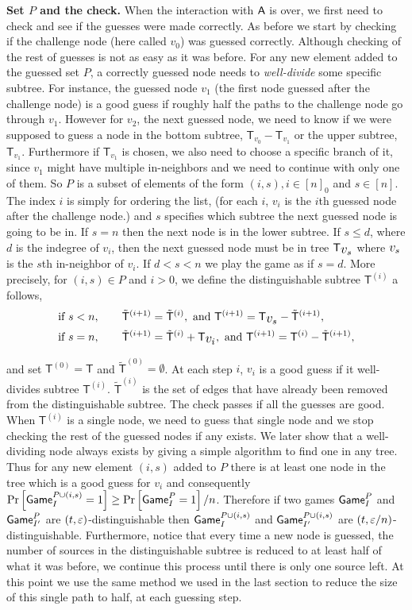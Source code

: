 \documentclass{article}
\def\A{{\sf A}}
\newcommand{\game}{{\sf Game}}
\newcommand{\T}{{\mathsf T}}
\newcommand{\dgg}[2]{\game_{#1}^{#2}}
\newcommand{\dT}{{\mathsf{T}}}
\newcommand{\bigv}[1]{\mbox{\large $v_{#1}$}}
\newcommand{\bigt}[1]{{\dT}^{({#1})}}
\newcommand{\bigtb}[1]{\tilde{\dT}^{({#1})}}
\begin{document}
  \textbf{Set $P$ and the check.} When the interaction with $\A$ is over, we first need to check and see if the guesses were made correctly. As before we start by checking if the challenge node (here called $v_0$) was guessed correctly. Although checking of the rest of guesses is not as easy as it was before. For any new element added to the guessed set $P$, a correctly guessed node needs to \textit{well-divide} some specific subtree. For instance, the guessed node $v_1$ (the first node guessed after the challenge node) is a good guess if roughly half the paths to the challenge node go through $v_1$. However for $v_2$, the next guessed node, we need to know if we were supposed to guess a node in the bottom subtree, $\T_{v_0}-\T_{v_1}$ or the upper subtree, $\T_{v_1}$. Furthermore if $\T_{v_1}$ is chosen, we also need to choose a specific branch of it, since $v_1$ might have multiple in-neighbors and we need to continue with only one of them. So $P$ is a subset of elements of the form $(i,s), i\in [n]_0$ and $s \in [n]$. The index $i$ is simply for ordering the list, (for each $i$, $v_i$ is the $i$th guessed node after the challenge node.) and $s$ specifies which subtree the next guessed node is going to be in. If $s=n$ then the next node is in the lower subtree. If $s\leq d$, where $d$ is the indegree of $v_i$, then the next guessed node must be in tree $\T_{\bigv{s} }$ where $\bigv{s}$ is the $s$th in-neighbor of $v_i$. If $d<s<n$ we play the game as if $s=d$. More precisely, for $(i,s)\in P$ and $i>0$, we define the distinguishable subtree $\bigt{i}$ a follows, 
  \begin{align*}
&\text{if } s<n, \qquad \bigtb{i+1}=\bigtb{i}, \text{ and }\bigt{i+1}=\T_{\bigv{s}}-\bigtb{i+1}, \\
&\text{if } s=n, \qquad \bigtb{i+1}=\bigtb{i}+\T_{\bigv{i}}, \text{ and }\bigt{i+1}=\bigt{i}- \bigtb{i+1}, 
  \end{align*}

 and set $\bigt{0}=\T$ and $\bigtb{0}=\emptyset$. At each step $i$, $v_i$ is a good guess if it well-divides subtree $\bigt{i}$. $\bigtb{i}$ is the set of edges that have already been removed from the distinguishable subtree. The check passes if all the guesses are good. When $\bigt{i}$ is a single node, we need to guess that single node and we stop checking the rest of the guessed nodes if any exists. We later show that a well-dividing node always exists by giving a simple algorithm to find one in any tree. Thus for any new element $(i,s)$ added to $P$ there is at least one node in the tree which is a good guess for $v_i$ and consequently $\prob{\game_{I}^{P\cup (i,s) }=1}\geq \prob{\dgg{I}{P}=1}/n$. Therefore if two games $ \dgg{I}{P}$ and $\dgg{I'}{P}$ are $(t,\varepsilon)$-distinguishable then $ \game_{I}^{P\cup (i,s) }$ and $\game_{I'}^{P\cup (i,s)}$ are $(t,\varepsilon/n)$-distinguishable. Furthermore, notice that every time a new node is guessed, the number of sources in the distinguishable subtree is reduced to at least half of what it was before, we continue this process until  there is only one source left. At this point we use the same method we used in the last section to reduce the size of this single path to half, at each guessing step. \\
\end{document}
